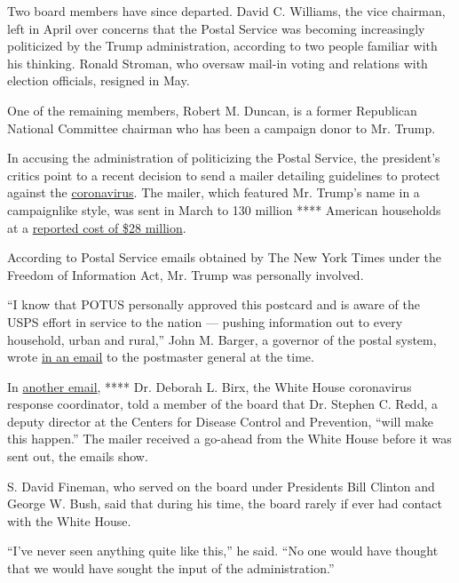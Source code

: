 Two board members have since departed. David C. Williams, the vice
chairman, left in April over concerns that the Postal Service was
becoming increasingly politicized by the Trump administration, according
to two people familiar with his thinking. Ronald Stroman, who oversaw
mail-in voting and relations with election officials, resigned in May.

One of the remaining members, Robert M. Duncan, is a former Republican
National Committee chairman who has been a campaign donor to Mr. Trump.

In accusing the administration of politicizing the Postal Service, the
president's critics point to a recent decision to send a mailer
detailing guidelines to protect against the
\href{https://www.nytimes.com/interactive/2020/us/coronavirus-us-cases.htmlhttps://www.nytimes.com/interactive/2020/us/coronavirus-us-cases.html}{coronavirus}.
The mailer, which featured Mr. Trump's name in a campaignlike style, was
sent in March to 130 million **** American households at a
\href{https://www.usatoday.com/story/news/politics/2020/05/28/coronavirus-post-card-trump-cost-post-office-28-million/5274034002/}{reported
cost of \$28 million}.

According to Postal Service emails obtained by The New York Times under
the Freedom of Information Act, Mr. Trump was personally involved.

``I know that POTUS personally approved this postcard and is aware of
the USPS effort in service to the nation --- pushing information out to
every household, urban and rural,'' John M. Barger, a governor of the
postal system, wrote
\href{https://www.documentcloud.org/documents/7010858-USPS-Email-Trump-Personally-Approved-28M.html}{in
an email} to the postmaster general at the time.

In
\href{https://www.documentcloud.org/documents/7010863-USPS-Emails-Show-Trump-Coronavirus-Postcard-Was.html}{another
email}, **** Dr. Deborah L. Birx, the White House coronavirus response
coordinator, told a member of the board that Dr. Stephen C. Redd, a
deputy director at the Centers for Disease Control and Prevention,
``will make this happen.'' The mailer received a go-ahead from the White
House before it was sent out, the emails show.

S. David Fineman, who served on the board under Presidents Bill Clinton
and George W. Bush, said that during his time, the board rarely if ever
had contact with the White House.

``I've never seen anything quite like this,'' he said. ``No one would
have thought that we would have sought the input of the
administration.''

